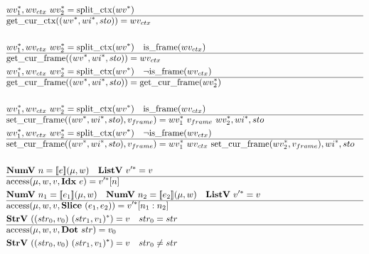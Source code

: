 \begin{align*}
%
\newline \\
  &\seq{wv_1}, wv_{ctx} ~ \seq{wv_2} = \splitctx(\seq{wv}) \\
  \hline
  &\getcurctx((\seq{wv}, \seq{wi}, sto)) = wv_{ctx} \\
%
\newline \\
  &\seq{wv_1}, wv_{ctx} ~ \seq{wv_2} = \splitctx(\seq{wv}) \quad \isframe(wv_{ctx}) \\
  \hline
  &\getcurframe((\seq{wv}, \seq{wi}, sto)) = wv_{ctx} \\
  &\seq{wv_1}, wv_{ctx} ~ \seq{wv_2} = \splitctx(\seq{wv}) \quad \neg \isframe(wv_{ctx}) \\
  \hline
  &\getcurframe((\seq{wv}, \seq{wi}, sto)) = \getcurframe(\seq{wv_2}) \\
%
\newline \\
  &\seq{wv_1}, wv_{ctx} ~ \seq{wv_2} = \splitctx(\seq{wv}) \quad \isframe(wv_{ctx}) \\
  \hline
  &\setcurframe((\seq{wv}, \seq{wi}, sto), v_{frame})
  =
  \seq{wv_1} ~ v_{frame} ~ \seq{wv_2}, \seq{wi}, sto \\
  &\seq{wv_1}, wv_{ctx} ~ \seq{wv_2} = \splitctx(\seq{wv}) \quad \neg \isframe(wv_{ctx}) \\
  \hline
  &\setcurframe((\seq{wv}, \seq{wi}, sto), v_{frame})
  =
  \seq{wv_1} ~ wv_{ctx} ~ \setcurframe(\seq{wv_2}, v_{frame}), \seq{wi}, sto \\
%
\newline \\
  &\numv ~ n = \sem{e}(\mu, w) \quad \listv ~ \seq{v'} = v \\
  \hline
  &\access(\mu, w, v, \idxp ~ e) = \seq{v'}[n] \\
  &\numv ~ n_1 = \sem{e_1}(\mu, w) \quad
  \numv ~ n_2 = \sem{e_2}(\mu, w) \quad
  \listv ~ \seq{v'} = v \\
  \hline
  &\access(\mu, w, v, \slicep ~ (e_1, e_2)) = \seq{v'}[n_1: n_2] \\
  &\strv ~ ((str_0, v_0) ~ \seq{(str_1, v_1)}) = v \quad
  str_0 = str \\
  \hline
  &\access(\mu, w, v, \dotp ~ str) = v_0 \\
  &\strv ~ ((str_0, v_0) ~ \seq{(str_1, v_1)}) = v \quad
  str_0 \not= str \\

\end{align*}
